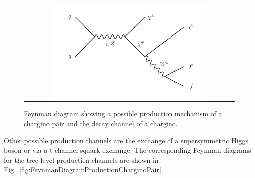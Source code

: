\begin{figure}[!tb]
  \centering 
  \begin{tabular}{c}
    \includegraphics[width=0.75\textwidth]{figures/analysis/ChiChi_ProductionAndDecay.pdf}
  \end{tabular}
  \caption{Feynman diagram showing a possible production mechanism of a chargino pair and the decay channel of a chargino.}
  \label{fig:FeynmanDiagram}
\end{figure}

Other possible production channels are the exchange of a supersymmetric Higgs boson or via a t-channel squark exchange. 
The corresponding Feynman diagrams for the tree level production channels are shown in Fig.~\ref{fig:FeynmanDiagramProductionCharginoPair}.


